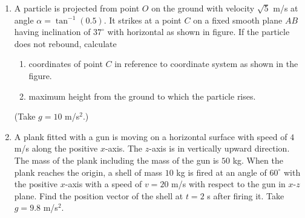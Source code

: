 \documentclass{article}
\begin{document}
\begin{enumerate}
    \item A particle is projected from point \( O \) on the ground with velocity \( \sqrt{5} \) m/s at angle \( \alpha = \tan^{-1}(0.5) \). It strikes at a point \( C \) on a fixed smooth plane \( AB \) having inclination of \( 37^\circ \) with horizontal as shown in figure. If the particle does not rebound, calculate
    \begin{enumerate}
      \item coordinates of point \( C \) in reference to coordinate system as shown in the figure.
      \item maximum height from the ground to which the particle rises.
    \end{enumerate}
    (Take \( g = 10 \) m/s\(^2\).)
  
    \item A plank fitted with a gun is moving on a horizontal surface with speed of \( 4 \) m/s along the positive \( x \)-axis. The \( z \)-axis is in vertically upward direction. The mass of the plank including the mass of the gun is \( 50 \) kg. When the plank reaches the origin, a shell of mass \( 10 \) kg is fired at an angle of \( 60^\circ \) with the positive \( x \)-axis with a speed of \( v = 20 \) m/s with respect to the gun in \( x \)-\( z \) plane. Find the position vector of the shell at \( t = 2 \) s after firing it. Take \( g = 9.8 \) m/s\(^2\).
  
  \end{enumerate}

  
\end{document}
